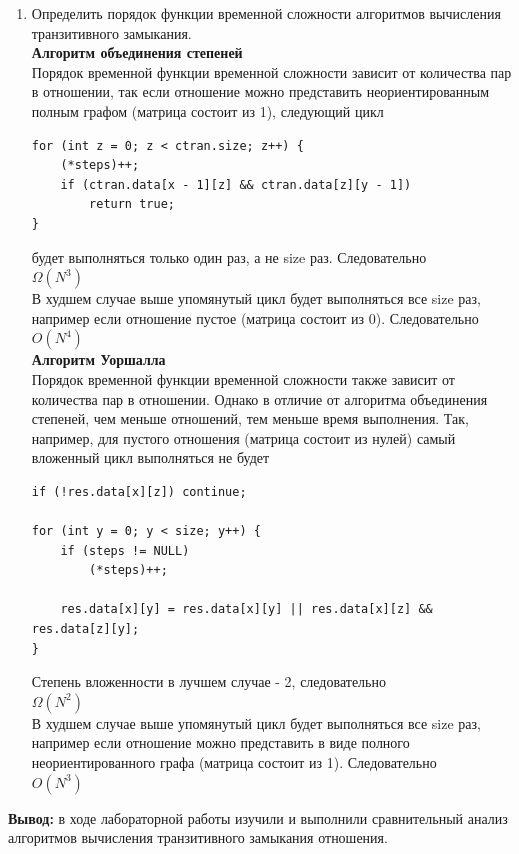 \documentclass[a4paper,14pt]{extarticle}
\begin{document}
\begin{enumerate}[1.]
	\item Определить порядок функции временной сложности алгоритмов вычисления транзитивного замыкания.\\
	      \textbf{Алгоритм объединения степеней}\\
	      Порядок временной функции временной сложности зависит от количества пар в отношении, так если отношение можно представить неориентированным полным графом (матрица состоит из 1), следующий цикл
	      \begin{verbatim}
for (int z = 0; z < ctran.size; z++) {
	(*steps)++;
	if (ctran.data[x - 1][z] && ctran.data[z][y - 1])
		return true;
}
\end{verbatim}
	      будет выполняться только один раз, а не size раз. Следовательно\\
	      $\Omega(N ^ 3)$  \\
	      В худшем случае выше упомянутый цикл будет выполняться все size раз, например если отношение пустое (матрица состоит из 0). Следовательно\\
	      $O(N^4)$\\
	      \textbf{Алгоритм Уоршалла}\\
		  Порядок временной функции временной сложности также зависит от количества пар в отношении. Однако в отличие от алгоритма объединения степеней, чем меньше отношений, тем меньше время выполнения. Так, например, для пустого отношения (матрица состоит из нулей) самый вложенный цикл выполняться не будет
	      \begin{verbatim}
if (!res.data[x][z]) continue;
            
for (int y = 0; y < size; y++) {
    if (steps != NULL)
        (*steps)++;

    res.data[x][y] = res.data[x][y] || res.data[x][z] && res.data[z][y];
}
\end{verbatim}
	      Степень вложенности в лучшем случае - 2, следовательно\\
	      $\Omega(N ^ 2)$  \\
	      В худшем случае выше упомянутый цикл будет выполняться все size раз, например если отношение можно представить в виде полного неориентированного графа (матрица состоит из 1). Следовательно\\
	      $O(N^3)$\\
\end{enumerate}

\textbf{Вывод: } в ходе лабораторной работы изучили и выполнили сравнительный анализ алгоритмов вычисления транзитивного замыкания отношения.
\end{document}

